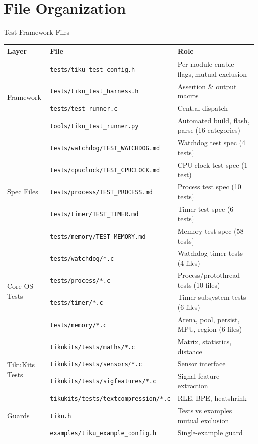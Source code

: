 \documentclass[aspectratio=169, 10pt]{beamer}
\begin{document}
\section{File Organization}

\begin{frame}[fragile]{Test Framework Files}
\begin{table}
\centering
\scriptsize
\begin{tabular}{@{}lll@{}}
\toprule
\textbf{Layer} & \textbf{File} & \textbf{Role} \\
\midrule
\multirow{4}{*}{Framework}
  & \texttt{tests/tiku\_test\_config.h}    & Per-module enable flags, mutual exclusion \\
  & \texttt{tests/tiku\_test\_harness.h}   & Assertion \& output macros \\
  & \texttt{tests/test\_runner.c}          & Central dispatch \\
  & \texttt{tools/tiku\_test\_runner.py}   & Automated build, flash, parse (16 categories) \\
\midrule
\multirow{5}{*}{Spec Files}
  & \texttt{tests/watchdog/TEST\_WATCHDOG.md}  & Watchdog test spec (4 tests) \\
  & \texttt{tests/cpuclock/TEST\_CPUCLOCK.md}  & CPU clock test spec (1 test) \\
  & \texttt{tests/process/TEST\_PROCESS.md}    & Process test spec (10 tests) \\
  & \texttt{tests/timer/TEST\_TIMER.md}        & Timer test spec (6 tests) \\
  & \texttt{tests/memory/TEST\_MEMORY.md}      & Memory test spec (58 tests) \\
\midrule
\multirow{4}{*}{Core OS Tests}
  & \texttt{tests/watchdog/*.c}    & Watchdog timer tests (4 files) \\
  & \texttt{tests/process/*.c}     & Process/protothread tests (10 files) \\
  & \texttt{tests/timer/*.c}       & Timer subsystem tests (6 files) \\
  & \texttt{tests/memory/*.c}      & Arena, pool, persist, MPU, region (6 files) \\
\midrule
\multirow{4}{*}{TikuKits Tests}
  & \texttt{tikukits/tests/maths/*.c}          & Matrix, statistics, distance \\
  & \texttt{tikukits/tests/sensors/*.c}        & Sensor interface \\
  & \texttt{tikukits/tests/sigfeatures/*.c}    & Signal feature extraction \\
  & \texttt{tikukits/tests/textcompression/*.c} & RLE, BPE, heatshrink \\
\midrule
Guards
  & \texttt{tiku.h}                         & Tests vs examples mutual exclusion \\
  & \texttt{examples/tiku\_example\_config.h} & Single-example guard \\
\bottomrule
\end{tabular}
\end{table}
\end{frame}
\end{document}
